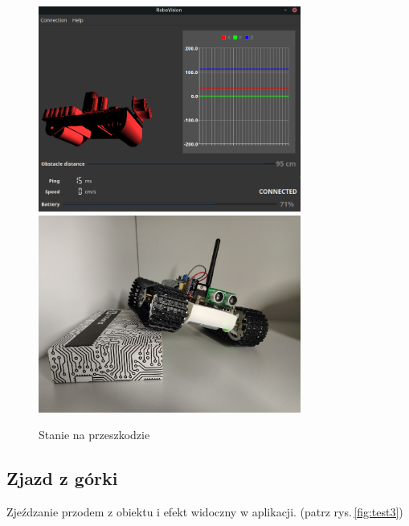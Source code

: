 \documentclass[12pt,a4paper,polish]{article}
\begin{document}
  \begin{figure}[h]
    \centering
    \includegraphics[width=0.77\textwidth]{img/final/2.png}
    \includegraphics[width=0.77\textwidth]{img/final/2e.jpg}
    \caption{Stanie na przeszkodzie}
    \label{fig:test2}
  \end{figure}

  \subsection{Zjazd z górki}
  Zjeźdzanie przodem z obiektu i efekt widoczny w aplikacji.
  (patrz rys.\,\ref{fig:test3})
\end{document}
